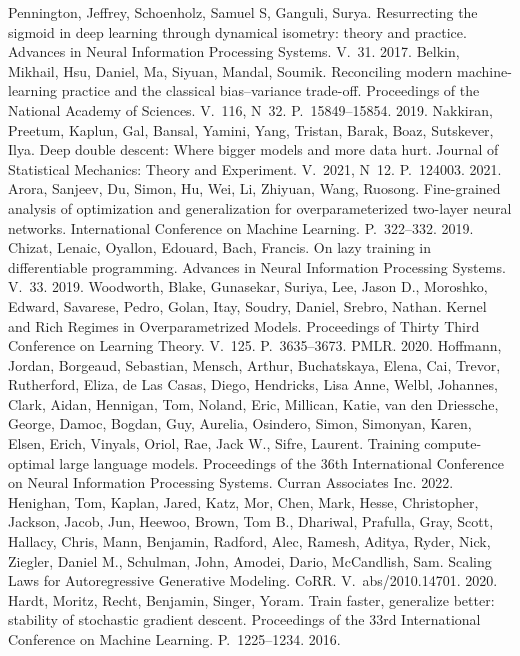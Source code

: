  Pennington, Jeffrey, Schoenholz, Samuel S, Ganguli, Surya. Resurrecting the sigmoid in deep learning through dynamical isometry: theory and practice. Advances in Neural Information Processing Systems. V.~31. 2017.
 Belkin, Mikhail, Hsu, Daniel, Ma, Siyuan, Mandal, Soumik. Reconciling modern machine-learning practice and the classical bias--variance trade-off. Proceedings of the National Academy of Sciences. V.~116, N~32. P.~15849--15854. 2019.
 Nakkiran, Preetum, Kaplun, Gal, Bansal, Yamini, Yang, Tristan, Barak, Boaz, Sutskever, Ilya. Deep double descent: Where bigger models and more data hurt. Journal of Statistical Mechanics: Theory and Experiment. V.~2021, N~12. P.~124003. 2021.
 Arora, Sanjeev, Du, Simon, Hu, Wei, Li, Zhiyuan, Wang, Ruosong. Fine-grained analysis of optimization and generalization for overparameterized two-layer neural networks. International Conference on Machine Learning. P.~322--332. 2019.
 Chizat, Lenaic, Oyallon, Edouard, Bach, Francis. On lazy training in differentiable programming. Advances in Neural Information Processing Systems. V.~33. 2019.
 Woodworth, Blake, Gunasekar, Suriya, Lee, Jason D., Moroshko, Edward, Savarese, Pedro, Golan, Itay, Soudry, Daniel, Srebro, Nathan. Kernel and Rich Regimes in Overparametrized Models. Proceedings of Thirty Third Conference on Learning Theory. V.~125. P.~3635--3673. PMLR. 2020.
 Hoffmann, Jordan, Borgeaud, Sebastian, Mensch, Arthur, Buchatskaya, Elena, Cai, Trevor, Rutherford, Eliza, de Las Casas, Diego, Hendricks, Lisa Anne, Welbl, Johannes, Clark, Aidan, Hennigan, Tom, Noland, Eric, Millican, Katie, van den Driessche, George, Damoc, Bogdan, Guy, Aurelia, Osindero, Simon, Simonyan, Karen, Elsen, Erich, Vinyals, Oriol, Rae, Jack W., Sifre, Laurent. Training compute-optimal large language models. Proceedings of the 36th International Conference on Neural Information Processing Systems. Curran Associates Inc. 2022.
 Henighan, Tom, Kaplan, Jared, Katz, Mor, Chen, Mark, Hesse, Christopher, Jackson, Jacob, Jun, Heewoo, Brown, Tom B., Dhariwal, Prafulla, Gray, Scott, Hallacy, Chris, Mann, Benjamin, Radford, Alec, Ramesh, Aditya, Ryder, Nick, Ziegler, Daniel M., Schulman, John, Amodei, Dario, McCandlish, Sam. Scaling Laws for Autoregressive Generative Modeling. CoRR. V.~abs/2010.14701. 2020.
 Hardt, Moritz, Recht, Benjamin, Singer, Yoram. Train faster, generalize better: stability of stochastic gradient descent. Proceedings of the 33rd International Conference on Machine Learning. P.~1225--1234. 2016.
